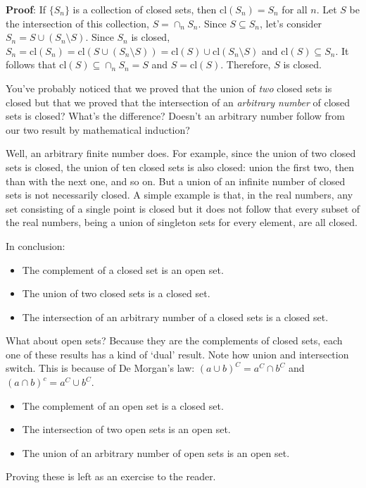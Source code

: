 \documentclass{report}
\newcommand{\cl}{\mathrm{cl}}
\begin{document}
{\bf Proof}: If $\{S_n\}$ is a collection of closed sets, then $\cl(S_n) = S_n$ for all $n$. Let $S$ be the intersection of this collection, $S=\cap_n S_n$. Since $S ⊆ S_n$, let's consider $S_n = S∪(S_n \setminus S)$. Since $S_n$ is closed, $S_n = \cl(S_n) = \cl(S∪(S_n \setminus S)) = \cl(S)∪\cl(S_n \setminus S)$ and $\cl(S) ⊆ S_n$. It follows that $\cl(S) ⊆ \cap_n S_n = S$ and $S = \cl(S)$. Therefore, $S$ is closed.

You've probably noticed that we proved that the union of \emph{two} closed sets is closed but that we proved that the intersection of an \emph{arbitrary number} of closed sets is closed? What's the difference? Doesn't an arbitrary number follow from our two result by mathematical induction?

Well, an arbitrary finite number does. For example, since the union of two closed sets is closed, the union of ten closed sets is also closed: union the first two, then than with the next one, and so on. But a union of an infinite number of closed sets is not necessarily closed. A simple example is that, in the real numbers, any set consisting of a single point is closed but it does not follow that every subset of the real numbers, being a union of singleton sets for every element, are all closed.

In conclusion:

\begin{itemize}
\item The complement of a closed set is an open set.
\item The union of two closed sets is a closed set.
\item The intersection of an arbitrary number of a closed sets is a closed set.
\end{itemize}

What about open sets? Because they are the complements of closed sets, each one of these results has a kind of `dual' result. Note how union and intersection switch. This is because of De Morgan's law: $(a ∪ b)^C = a^C ∩ b^C$ and $(a ∩ b)^c = a^C ∪ b^C$.

\begin{itemize}
\item The complement of an open set is a closed set.
\item The intersection of two open sets is an open set.
\item The union of an arbitrary number of open sets is an open set.
\end{itemize}

Proving these is left as an exercise to the reader.
\end{document}

